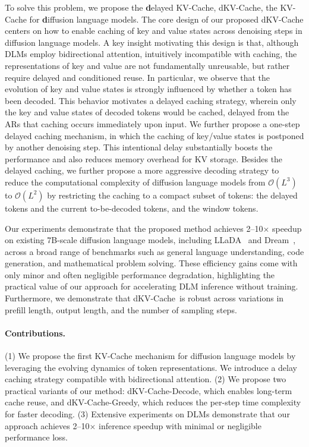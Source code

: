 \documentclass{article}
\newcommand{\methodname}{dKV-Cache}
\newcommand{\dmethodname}{dKV-Cache-Decode}
\newcommand{\mmethodname}{dKV-Cache-Greedy}
\begin{document}
To solve this problem, we propose the \textbf{d}elayed KV-Cache, \methodname, the KV-Cache for \textbf{d}iffusion language models.
The core design of our proposed dKV-Cache centers on how to enable caching of key and value states across denoising steps in diffusion language models. A key insight motivating this design is that, although DLMs employ bidirectional attention, intuitively incompatible with caching, the representations of key and value are not fundamentally unreusable, but rather require delayed and conditioned reuse.
In particular, we observe that the evolution of key and value states is strongly influenced by whether a token has been decoded. This behavior motivates a delayed caching strategy, wherein only the key and value states of decoded tokens would be cached, delayed from the ARs that caching occurs immediately upon input.
We further propose a one-step delayed caching mechanism, in which the caching of key/value states is postponed by another denoising step. This intentional delay substantially boosts the performance and also reduces memory overhead for KV storage. Besides the delayed caching, we further propose a more aggressive decoding strategy to reduce the computational complexity of diffusion language models from $\mathcal{O}(L^3)$ to $\mathcal{O}(L^2)$ by restricting the caching to a compact subset of tokens: the delayed tokens and the current to-be-decoded tokens, and the window tokens.

Our experiments demonstrate that the proposed method achieves 2–10$\times$ speedup on existing 7B-scale diffusion language models, including LLaDA~\cite{nie2025llada} and Dream~\cite{dream2025}, across a broad range of benchmarks such as general language understanding, code generation, and mathematical problem solving. These efficiency gains come with only minor and often negligible performance degradation, highlighting the practical value of our approach for accelerating DLM inference without training. Furthermore, we demonstrate that \methodname\ is robust across variations in prefill length, output length, and the number of sampling steps.

\paragraph{Contributions.} (1) We propose the first KV-Cache mechanism for diffusion language models by leveraging the evolving dynamics of token representations. We introduce a delay caching strategy compatible with bidirectional attention. (2) We propose two practical variants of our method: \dmethodname, which enables long-term cache reuse, and \mmethodname, which reduces the per-step time complexity for faster decoding. (3) 
Extensive experiments on DLMs demonstrate that our approach achieves 2–10$\times$ inference speedup with minimal or negligible performance loss.
\end{document}
